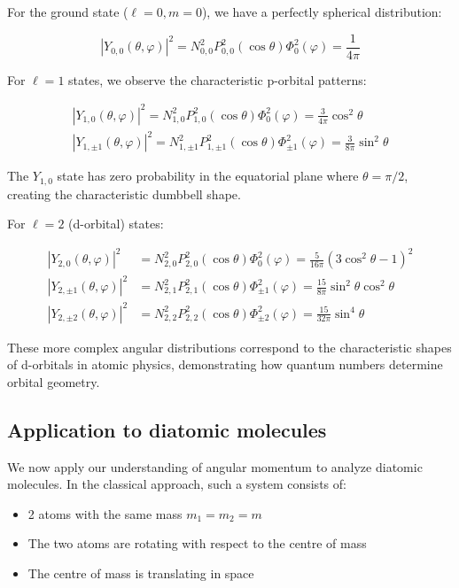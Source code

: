 \documentclass[italian]{HKNdocument}
\begin{document}
For the ground state ($\ell=0, m=0$), we have a perfectly spherical distribution:

\begin{equation}
\left|Y_{0,0}(\theta, \varphi)\right|^{2}=N_{0,0}^{2} P_{0,0}^{2}(\cos \theta) \Phi_{0}^{2}(\varphi)=\frac{1}{4 \pi} \label{eq:8.60}
\end{equation}

For $\ell=1$ states, we observe the characteristic p-orbital patterns:

\[
\begin{array}{r}
\left|Y_{1,0}(\theta, \varphi)\right|^{2}=N_{1,0}^{2} P_{1,0}^{2}(\cos \theta) \Phi_{0}^{2}(\varphi)=\frac{3}{4 \pi} \cos ^{2} \theta \\
\left|Y_{1, \pm 1}(\theta, \varphi)\right|^{2}=N_{1, \pm 1}^{2} P_{1, \pm 1}^{2}(\cos \theta) \Phi_{ \pm 1}^{2}(\varphi)=\frac{3}{8 \pi} \sin ^{2} \theta \label{eq:8.61}
\end{array}
\]

The $Y_{1,0}$ state has zero probability in the equatorial plane where $\theta=\pi/2$, creating the characteristic dumbbell shape.

For $\ell=2$ (d-orbital) states:

\begin{align}
\left|Y_{2,0}(\theta, \varphi)\right|^{2} & =N_{2,0}^{2} P_{2,0}^{2}(\cos \theta) \Phi_{0}^{2}(\varphi)=\frac{5}{16 \pi}\left(3 \cos ^{2} \theta-1\right)^{2} \\
\left|Y_{2, \pm 1}(\theta, \varphi)\right|^{2} & =N_{2,1}^{2} P_{2,1}^{2}(\cos \theta) \Phi_{ \pm 1}^{2}(\varphi)=\frac{15}{8 \pi} \sin ^{2} \theta \cos ^{2} \theta  \label{eq:8.62}\\
\left|Y_{2, \pm 2}(\theta, \varphi)\right|^{2} & =N_{2,2}^{2} P_{2,2}^{2}(\cos \theta) \Phi_{ \pm 2}^{2}(\varphi)=\frac{15}{32 \pi} \sin ^{4} \theta
\end{align}

These more complex angular distributions correspond to the characteristic shapes of d-orbitals in atomic physics, demonstrating how quantum numbers determine orbital geometry.

\subsection{Application to diatomic molecules}
We now apply our understanding of angular momentum to analyze diatomic molecules. In the classical approach, such a system consists of:

\begin{itemize}
  \item 2 atoms with the same mass $m_{1}=m_{2}=m$
  \item The two atoms are rotating with respect to the centre of mass
  \item The centre of mass is translating in space
\end{itemize}
\end{document}
